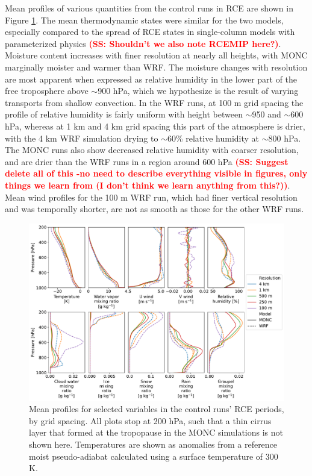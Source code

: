 \documentclass[draft]{agujournal2019}
\newcommand{\todo}[1]{\textcolor{red}{\textbf{(#1)}}}
\begin{document}
Mean profiles of various quantities from the control runs in RCE are shown in Figure
\ref{fig:rce_profiles}. The mean thermodynamic states were similar for the two models,
especially compared to the spread of
RCE states in single-column models with parameterized physics \cite{Hwong_JAMES_2021} \todo{SS: Shouldn't we also note RCEMIP here?}. Moisture content
increases with finer resolution at nearly all heights, with MONC  marginally moister
and warmer than WRF. The moisture changes with resolution are most apparent when expressed as relative humidity in the lower part of the free
troposphere above $\sim$900 hPa, which we hypothesize is the result of varying
transports from shallow convection. In the WRF runs, at 100 m grid spacing the
profile of relative humidity is fairly uniform with height between $\sim$950 and
$\sim$600 hPa, whereas at 1 km and 4 km grid spacing this part of the atmosphere
is drier, with the 4 km WRF simulation drying to $\sim$60\% relative humidity at
$\sim$800 hPa. The MONC runs also show decreased relative humidity with coarser
resolution, and are drier than the WRF runs in a region around 600 hPa \todo{SS: Suggest delete all of this -no need to describe everything visible in figures, only things we learn from (I don't think we learn anything from this?)}. Mean
wind profiles for the 100 m WRF run, which had finer vertical resolution and was
temporally shorter, are not as smooth as those for the other WRF runs.

\begin{figure}[pth]
    \noindent\includegraphics[width=\textwidth]{figures/rce_profiles}
    \caption{Mean profiles for selected variables in the control runs' RCE
    periods, by grid spacing. All plots stop at 200 hPa, such that a thin cirrus
    layer that formed at the tropopause in the MONC simulations is not shown
    here. Temperatures are shown as anomalies from a reference moist
    pseudo-adiabat calculated using a surface temperature of 300 K.}
    \label{fig:rce_profiles}
\end{figure}
\end{document}
